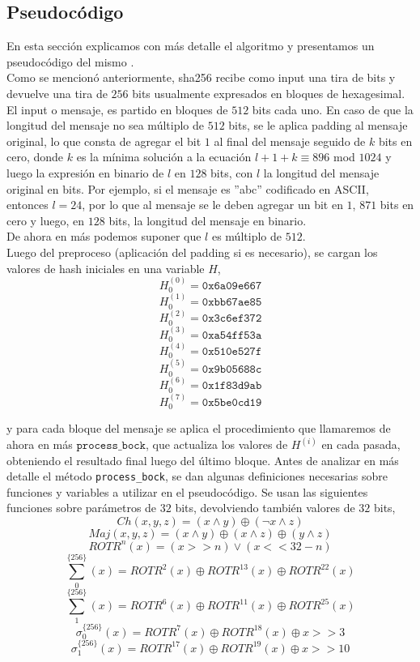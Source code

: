 \subsection{Pseudocódigo}
\label{sec:shapseudo}

En esta sección explicamos con más detalle el algoritmo y presentamos un pseudocódigo del mismo \cite{Fips}.\\

Como se mencionó anteriormente, sha256 recibe como input una tira de bits y devuelve una tira de $256$ bits usualmente expresados en bloques de hexagesimal. El input o mensaje, es partido en bloques de $512$ bits cada uno. En caso de que la longitud del mensaje no sea múltiplo de $512$ bits, se le aplica padding al mensaje original, lo que consta de agregar el bit $1$ al final del mensaje seguido de $k$ bits en cero, donde $k$ es la mínima solución a la ecuación $l + 1 + k \equiv 896$ mod $1024$ y luego la expresión en binario de $l$ en $128$ bits, con $l$ la longitud del mensaje original en bits. Por ejemplo, si el mensaje es ''abc'' codificado en ASCII, entonces $l = 24$, por lo que al mensaje se le deben agregar un bit en $1$, $871$ bits en cero y luego, en $128$ bits, la longitud del mensaje en binario.\\ De ahora en más podemos suponer que $l$ es múltiplo de $512$. \\
\indent Luego del preproceso (aplicación del padding si es necesario), se cargan los valores de hash iniciales en una variable $H$,            
                                    $$ H^{(0)}_0 = \texttt{0x6a09e667} $$
                                    $$ H^{(1)}_0 = \texttt{0xbb67ae85} $$
                                    $$ H^{(2)}_0 = \texttt{0x3c6ef372} $$
                                    $$ H^{(3)}_0 = \texttt{0xa54ff53a} $$
                                    $$ H^{(4)}_0 = \texttt{0x510e527f} $$
                                    $$ H^{(5)}_0 = \texttt{0x9b05688c} $$
                                    $$ H^{(6)}_0 = \texttt{0x1f83d9ab} $$
                                    $$ H^{(7)}_0 = \texttt{0x5be0cd19} $$

y para cada bloque del mensaje se aplica el procedimiento que llamaremos de ahora en más $\texttt{process\_bock}$, que actualiza los valores de $H^{(i)}$ en cada pasada, obteniendo el resultado final luego del último bloque. Antes de analizar en más detalle el método \texttt{process\_bock}, se dan algunas definiciones necesarias sobre funciones y variables a utilizar en el pseudocódigo. Se usan las siguientes funciones sobre parámetros de $32$ bits, devolviendo también valores de $32$ bits,
$$Ch ( x , y , z ) = (x \land y) \oplus (\neg x \land z)$$
$$Maj ( x , y , z ) = (x \land y) \oplus (x \land z) \oplus (y \land z) $$
$$ROTR^n(x) = (x >> n) \lor (x << 32 - n) $$
$$\sum^{\{256\}}_0(x) = ROTR^2(x) \oplus  ROTR^{13}(x) \oplus  ROTR^{22}(x)$$
$$\sum^{\{256\}}_1(x) = ROTR^6(x) \oplus  ROTR^{11}(x) \oplus  ROTR^{25}(x)$$
$$\sigma^{\{ 256\}}_0(x) = ROTR^7(x) \oplus  ROTR^{18}(x) \oplus  x >> 3 $$
$$\sigma^{\{ 256\}}_1(x) = ROTR^{17}(x) \oplus  ROTR^{19}(x) \oplus  x >> 10$$


